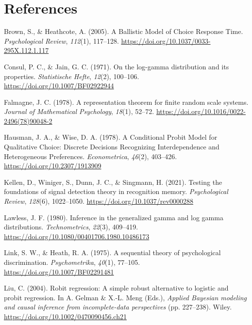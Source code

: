 \documentclass[
  man,
  floatsintext,
  longtable,
  a4paper,
  nolmodern,
  notxfonts,
  notimes,
  colorlinks=true,linkcolor=blue,citecolor=blue,urlcolor=blue]{apa7}
\newlength{\cslhangindent}
\newenvironment{CSLReferences}[2] %
 {\begin{list}{}{%
  \setlength{\itemindent}{0pt}
  \setlength{\leftmargin}{0pt}
  \setlength{\parsep}{0pt}
  \ifodd #1
   \setlength{\leftmargin}{\cslhangindent}
   \setlength{\itemindent}{-1\cslhangindent}
  \fi
  \setlength{\itemsep}{#2\baselineskip}}}
 {\end{list}}
\begin{document}
\section{References}\label{references}

\protect{}\label{refs}
\begin{CSLReferences}{1}{0}
Brown, S., \& Heathcote, A. (2005). A {Ballistic Model} of {Choice
Response Time}. \emph{Psychological Review}, \emph{112}(1), 117--128.
\url{https://doi.org/10.1037/0033-295X.112.1.117}

Consul, P. C., \& Jain, G. C. (1971). On the log-gamma distribution and
its properties. \emph{Statistische Hefte}, \emph{12}(2), 100--106.
\url{https://doi.org/10.1007/BF02922944}

Falmagne, J. C. (1978). A representation theorem for finite random scale
systems. \emph{Journal of Mathematical Psychology}, \emph{18}(1),
52--72. \url{https://doi.org/10.1016/0022-2496(78)90048-2}

Hausman, J. A., \& Wise, D. A. (1978). A {Conditional Probit Model} for
{Qualitative Choice}: {Discrete Decisions Recognizing Interdependence}
and {Heterogeneous Preferences}. \emph{Econometrica}, \emph{46}(2),
403--426. \url{https://doi.org/10.2307/1913909}

Kellen, D., Winiger, S., Dunn, J. C., \& Singmann, H. (2021). Testing
the foundations of signal detection theory in recognition memory.
\emph{Psychological Review}, \emph{128}(6), 1022--1050.
\url{https://doi.org/10.1037/rev0000288}

Lawless, J. F. (1980). Inference in the generalized gamma and log gamma
distributions. \emph{Technometrics}, \emph{22}(3), 409--419.
\url{https://doi.org/10.1080/00401706.1980.10486173}

Link, S. W., \& Heath, R. A. (1975). A sequential theory of
psychological discrimination. \emph{Psychometrika}, \emph{40}(1),
77--105. \url{https://doi.org/10.1007/BF02291481}

Liu, C. (2004). Robit regression: A simple robust alternative to
logistic and probit regression. In A. Gelman \& X.-L. Meng (Eds.),
\emph{Applied {Bayesian} modeling and causal inference from
incomplete-data perspectives} (pp. 227--238). Wiley.
\url{https://doi.org/10.1002/0470090456.ch21}


\end{CSLReferences}
\end{document}

